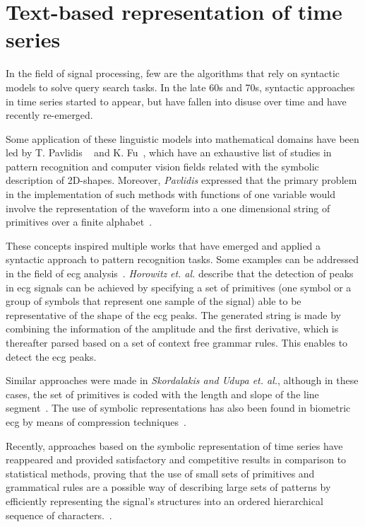 \section{Text-based representation of time series}

In the field of signal processing, few are the algorithms that rely on syntactic models to solve query search tasks. In the late 60s and 70s, syntactic approaches in time series started to appear, but have fallen into disuse over time and have recently re-emerged.
\par
Some application of these linguistic models into mathematical domains  have been led by T. Pavlidis ~\cite{pavlidis1,pavlidis2} and K. Fu~\cite{kfu7}, which have an exhaustive list of studies in pattern recognition and computer vision fields related with the symbolic description of 2D-shapes. Moreover, \textit{Pavlidis} expressed that the primary problem in the implementation of such methods with functions of one variable would involve the representation of the waveform into a one dimensional string of primitives over a finite alphabet~\cite{pavlidis2}.
\par
These concepts inspired multiple works that have emerged and applied a syntactic approach to pattern recognition tasks. Some examples can be addressed in the field of \gls{ecg} analysis~\cite{Horowitz, Udupa, Skordalakis, DCtnh}. \textit{Horowitz} \textit{et. al.} describe that the detection of peaks in \gls{ecg} signals can be achieved by specifying a set of primitives (one symbol or a group of symbols that represent one sample of the signal) able to be representative of the shape of the \gls{ecg} peaks. The generated string is made by combining the information of the amplitude and the first derivative, which is thereafter parsed based on a set of context free grammar rules. This enables to detect the \gls{ecg} peaks. 
\par
Similar approaches were made in \textit{Skordalakis and Udupa et. al.}, although in these cases, the set of primitives is coded with the length and slope of the line segment~\cite{Udupa,Skordalakis}. The use of symbolic representations has also been found in biometric \gls{ecg} by means of compression techniques~\cite{DCtnh}. 
\par
Recently, approaches based on the symbolic representation of time series have reappeared and provided satisfactory and competitive results in comparison to statistical methods, proving that the use of small sets of primitives and grammatical rules are a possible way of describing large sets of patterns by efficiently representing the signal's structures into an ordered hierarchical sequence of characters.~\cite{Hamdi2017}.
